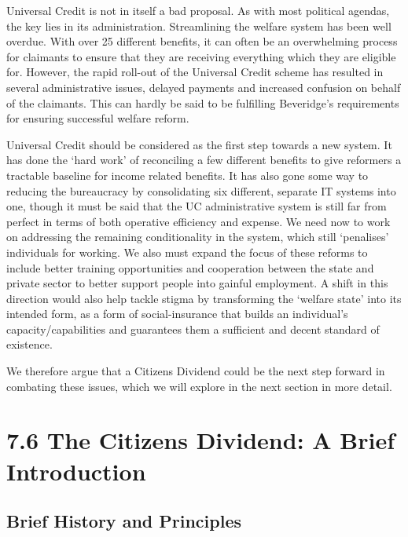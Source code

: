\documentclass[]{tufte-handout}
\begin{document}
Universal Credit is not in itself a bad proposal. As with most political
agendas, the key lies in its administration. Streamlining the welfare
system has been well overdue. With over 25 different benefits, it can
often be an overwhelming process for claimants to ensure that they are
receiving everything which they are eligible for. However, the rapid
roll-out of the Universal Credit scheme has resulted in several
administrative issues, delayed payments and increased confusion on
behalf of the claimants. This can hardly be said to be fulfilling
Beveridge's requirements for ensuring successful welfare reform.

Universal Credit should be considered as the first step towards a new
system. It has done the `hard work' of reconciling a few different
benefits to give reformers a tractable baseline for income related
benefits. It has also gone some way to reducing the bureaucracy by
consolidating six different, separate IT systems into one, though it
must be said that the UC administrative system is still far from perfect
in terms of both operative efficiency and expense. We need now to work
on addressing the remaining conditionality in the system, which still
`penalises' individuals for working. We also must expand the focus of
these reforms to include better training opportunities and cooperation
between the state and private sector to better support people into
gainful employment. A shift in this direction would also help tackle
stigma by transforming the `welfare state' into its intended form, as a
form of social-insurance that builds an individual's
capacity/capabilities and guarantees them a sufficient and decent
standard of existence.

We therefore argue that a Citizens Dividend could be the next step
forward in combating these issues, which we will explore in the next
section in more detail.

\hypertarget{the-citizens-dividend-a-brief-introduction}{%
\section{7.6 The Citizens Dividend: A Brief
Introduction}\label{the-citizens-dividend-a-brief-introduction}}

\hypertarget{brief-history-and-principles}{%
\subsection{Brief History and
Principles}\label{brief-history-and-principles}}
\end{document}
